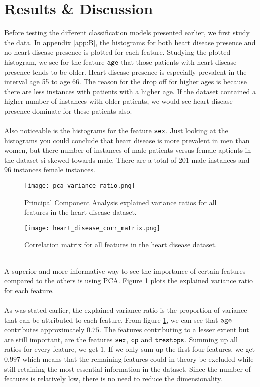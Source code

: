 \documentclass[a4paper,twocolumn]{article}
\begin{document}
\section{Results \& Discussion}
Before testing the different classification models presented earlier, we first study the data. In appendix \ref{app:B}, the histograms for both heart disease presence and no heart disease presence is plotted for each feature. Studying the plotted histogram, we see for the feature $\verb"age"$ that those patients with heart disease presence tends to be older. Heart disease presence is especially prevalent in the interval age 55 to age 66. The reason for the drop off for higher ages is because there are less instances with patients with a higher age. If the dataset contained a higher number of instances with older patients, we would see heart disease presence dominate for these patients also. \\
\\
Also noticeable is the histograms for the feature $\verb"sex"$. Just looking at the histograms you could conclude that heart disease is more prevalent in men than women, but there number of instances of male patients versus female aptients in the dataset si skewed towards male. There are a total of 201 male instances and 96 instances female instances.
\begin{figure}[ht]
    \centering
    \texttt{[image: pca\_variance\_ratio.png]}
    \caption{Principal Component Analysis explained variance ratios for all features in the heart disease dataset.}
    \label{fig:5}
\end{figure}
\begin{figure*}[b]
    \centering
    \texttt{[image: heart\_disease\_corr\_matrix.png]}
    \caption{Correlation matrix for all features in the heart disease dataset.}
    \label{fig:6}
\end{figure*}\\
A superior and more informative way to see the importance of certain features compared to the others is using PCA. Figure \ref{fig:5} plots the explained variance ratio for each feature.\\
\\
As was stated earlier, the explained variance ratio is the proportion of variance that can be attributed to each feature. From figure \ref{fig:5}, we can see that $\verb"age"$ contributes approximately $0.75$. The features contributing to a lesser extent but are still important, are the features $\verb"sex"$, $\verb"cp"$ and $\verb"trestbps"$. Summing up all ratios for every feature, we get $1$. If we only sum up the first four features, we get $0.997$ which means that the remaining features could in theory be excluded while still retaining the most essential information in the dataset. Since the number of features is relatively low, there is no need to reduce the dimensionality.\\
\end{document}
